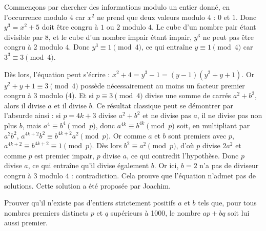 \begin{sol}

\medskip

Commençons par chercher des informations modulo un entier donné, en l'occurrence modulo $4$ car $x^2$ ne prend que deux valeurs modulo $4$ : $0$ et $1$. Donc $y^3 = x^2 + 5$ doit être congru à $1$ ou $2$ modulo $4$. Le cube d'un nombre pair étant divisible par $8$, et le cube d'un nombre impair étant impair, $y^3$ ne peut pas être congru à $2$ modulo $4$. Donc $y^3 \equiv 1 \pmod{4}$, ce qui entraîne $y \equiv 1 \pmod{4}$ car $3^3 \equiv 3 \pmod{4}$.

Dès lors, l'équation peut s'écrire : $x^2 + 4 = y^3 - 1 = (y-1)\left( y^2 + y + 1 \right)$. Or $y^2 + y + 1 \equiv 3 \pmod{4}$ possède nécessairement au moins un facteur premier congru à $3$ modulo (4). Et si $p \equiv 3 \pmod{4}$ divise une somme de carrés $a^2 + b^2$, alors il divise $a$ et il divise $b$. Ce résultat classique  peut se démontrer par l'absurde ainsi : si $p = 4k + 3$ divise $a^2 + b^2$ et ne divise pas $a$, il ne divise pas non plus $b$, mais $a^4 \equiv b^4 \pmod{p}$, donc $a^{4k} \equiv b^{4k} \pmod {p}$ soit, en multipliant par $a^2b^2$, $a^{4k+2}b^2 \equiv b^{4k+2}a^2 \pmod{p}$. Or comme $a$ et $b$ sont premiers avec $p$, $a^{4k+2} \equiv b^{4k+2} \equiv 1 \pmod{p}$. Dès lors $b^2 \equiv a^2 \pmod{p}$, d'où $p$ divise $2a^2$ et comme $p$ est premier impair, $p$ divise $a$, ce qui contredit l'hypothèse. Donc $p$ divise $a$, ce qui entraîne qu'il divise également $b$. Or ici, $b = 2$ n'a pas de diviseur congru à $3$ modulo $4$ : contradiction. Cela prouve que l'équation n'admet pas de solutions. Cette solution a été proposée par Joachim.

\end{sol}

\bigskip


\begin{exo}

\medskip

Prouver qu'il n'existe pas d'entiers strictement positifs $a$ et $b$ tels que, pour tous nombres premiers distincts $p$ et $q$ supérieurs à 1000, le nombre $ap + bq$ soit lui aussi premier.

\end{exo}

\bigskip

